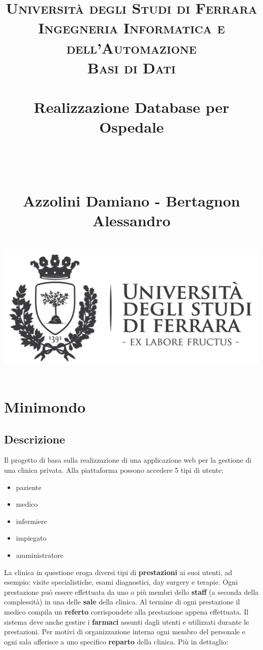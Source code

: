 \documentclass[paper=a4, fontsize=11pt,x11names]{report}
\title{
		\usefont{OT1}{bch}{b}{n}
		\normalfont \normalsize \textsc{Universit\`a degli Studi di Ferrara \\ Ingegneria Informatica e dell'Automazione
			\\ Basi di Dati} \\ [25pt]
		\horrule{0.5pt} \\[0.4cm]
		\Huge Realizzazione Database per Ospedale \date{}\\%
		\horrule{0.5pt} \\[0.4cm]
		\LARGE Azzolini Damiano - Bertagnon Alessandro \\ [0.4cm]
		\horrule{2pt} \\[0.8cm]
		\includegraphics{logoUnife}
}
\begin{document}
\maketitle

\newpage

\tableofcontents
\thispagestyle{empty}

\listoffigures
\thispagestyle{empty}


\newpage





\chapter{Minimondo}
\section{Descrizione}
Il progetto di basa sulla realizzazione di una applicazione web per la gestione di una clinica privata. Alla piattaforma possono accedere 5 tipi di utente:
\begin{itemize}
\item paziente
\item medico
\item infermiere
\item impiegato
\item amministratore
\end{itemize}  

La clinica in questione eroga diversi tipi di \textbf{prestazioni} ai suoi utenti, ad esempio: visite specialistiche, esami diagnostici, day surgery e terapie. Ogni prestazione può essere effettuata da uno o più membri dello \textbf{staff} (a seconda della complessità) in una delle \textbf{sale} della clinica. Al termine di ogni prestazione il medico compila un \textbf{referto} corrispondete alla prestazione appena effettuata. Il sistema deve anche gestire i \textbf{farmaci} assunti dagli utenti e utilizzati durante le prestazioni. Per motivi di organizzazione interna ogni membro del personale e ogni sala afferisce a uno specifico \textbf{reparto} della clinica. Più in dettaglio:\\
\end{document}
